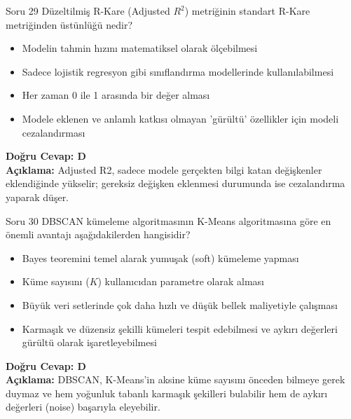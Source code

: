 \documentclass[12pt,a4paper]{article}
\begin{document}
\begin{testcard}{Soru 29}
    Düzeltilmiş R-Kare (Adjusted $R^2$) metriğinin standart R-Kare metriğinden üstünlüğü nedir?
    \begin{itemize}
        \item[A)] Modelin tahmin hızını matematiksel olarak ölçebilmesi
        \item[B)] Sadece lojistik regresyon gibi sınıflandırma modellerinde kullanılabilmesi
        \item[C)] Her zaman 0 ile 1 arasında bir değer alması
        \item[D)] Modele eklenen ve anlamlı katkısı olmayan 'gürültü' özellikler için modeli cezalandırması
    \end{itemize}
    \tcblower
    \textbf{Doğru Cevap: D} \\
    \textbf{Açıklama:} Adjusted R2, sadece modele gerçekten bilgi katan değişkenler eklendiğinde yükselir; gereksiz değişken eklenmesi durumunda ise cezalandırma yaparak düşer.
\end{testcard}

\begin{testcard}{Soru 30}
    DBSCAN kümeleme algoritmasının K-Means algoritmasına göre en önemli avantajı aşağıdakilerden hangisidir?
    \begin{itemize}
        \item[A)] Bayes teoremini temel alarak yumuşak (soft) kümeleme yapması
        \item[B)] Küme sayısını ($K$) kullanıcıdan parametre olarak alması
        \item[C)] Büyük veri setlerinde çok daha hızlı ve düşük bellek maliyetiyle çalışması
        \item[D)] Karmaşık ve düzensiz şekilli kümeleri tespit edebilmesi ve aykırı değerleri gürültü olarak işaretleyebilmesi
    \end{itemize}
    \tcblower
    \textbf{Doğru Cevap: D} \\
    \textbf{Açıklama:} DBSCAN, K-Means'in aksine küme sayısını önceden bilmeye gerek duymaz ve hem yoğunluk tabanlı karmaşık şekilleri bulabilir hem de aykırı değerleri (noise) başarıyla eleyebilir.
\end{testcard}
\end{document}
